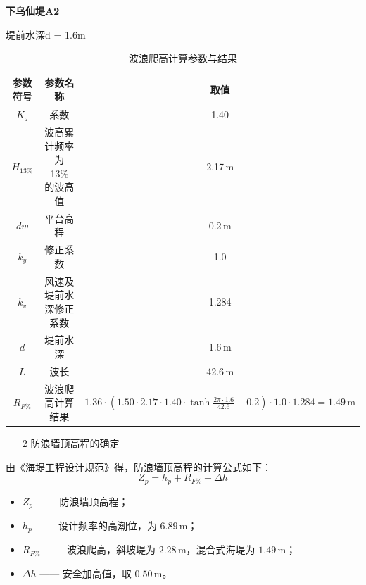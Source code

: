 \documentclass[UTF8, a4paper, 12pt]{ctexart} %
\begin{document}
\par

\textbf{下乌仙堤A2}

\par
堤前水深d = 1.6m
\par

\begin{table}[h]
    \centering
    \caption{波浪爬高计算参数与结果}
    \begin{tabular}{|c|c|c|}
        \hline
        参数符号 & 参数名称 & 取值 \\ \hline
        $K_z$ & 系数 & 1.40 \\ \hline
        $H_{13\%}$ & 波高累计频率为 13\% 的波高值 & 2.17\,m \\ \hline
        $dw$ & 平台高程 & 0.2\,m \\ \hline
        $k_y$ & 修正系数 & 1.0 \\ \hline
        $k_v$ & 风速及堤前水深修正系数 & 1.284 \\ \hline
        $d$ & 堤前水深 & 1.6\,m \\ \hline
        $L$ & 波长 & 42.6\,m \\ \hline
        $R_{F\%}$ & 波浪爬高计算结果 & $1.36 \cdot \left( 1.50 \cdot 2.17 \cdot 1.40 \cdot \tanh \frac{2 \pi \cdot 1.6}{42.6} - 0.2 \right) \cdot 1.0 \cdot 1.284 = 1.49\,\text{m}$ \\ \hline
    \end{tabular}
    \label{tab:wave_runup_calculation}
\end{table}



\newpage
\begin{itemize}
    \item [2] 防浪墙顶高程的确定
\end{itemize}
由《海堤工程设计规范》得，防浪墙顶高程的计算公式如下：
\begin{equation}
    Z_p = h_p + R_{F\%} + \Delta h
\end{equation}

\begin{itemize}
    \item $Z_p$ —— 防浪墙顶高程；
    \item $h_p$ —— 设计频率的高潮位，为 $6.89\,\text{m}$；
    \item $R_{F\%}$ —— 波浪爬高，斜坡堤为 $2.28\,\text{m}$，混合式海堤为 $1.49\,\text{m}$；
    \item $\Delta h$ —— 安全加高值，取 $0.50\,\text{m}$。
\end{itemize}
\end{document}
